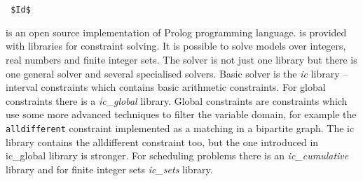 \section{\eclipse}
\verb= $Id$ =

\eclipse is an open source implementation of Prolog programming language. \eclipse
is provided with libraries for constraint solving. It is possible to solve models 
over integers, real numbers and finite integer sets. The solver is not just one library
but there is one general solver and several specialised solvers. Basic solver is
the {\em ic} library -- interval constraints which contains basic arithmetic constraints.
For global constraints there is a {\em ic\_global} library. Global constraints are constraints
which use some more advanced techniques to filter the variable domain, for example 
the \texttt{alldifferent} constraint implemented as a matching in a bipartite graph.
The ic library contains the alldifferent constraint too, but the one introduced in
ic\_global library is stronger. For scheduling problems there is an {\em ic\_cumulative}
library and for finite integer sets {\em ic\_sets} library.

